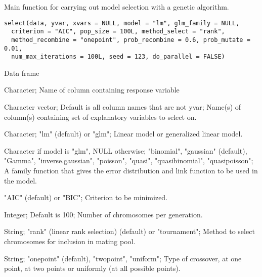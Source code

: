 %
\begin{Description}\relax
Main function for carrying out model selection with a genetic algorithm.
\end{Description}
%
\begin{Usage}
\begin{verbatim}
select(data, yvar, xvars = NULL, model = "lm", glm_family = NULL,
  criterion = "AIC", pop_size = 100L, method_select = "rank",
  method_recombine = "onepoint", prob_recombine = 0.6, prob_mutate = 0.01,
  num_max_iterations = 100L, seed = 123, do_parallel = FALSE)
\end{verbatim}
\end{Usage}
%
\begin{Arguments}
\begin{ldescription}
\item[\code{data}] Data frame

\item[\code{yvar}] Character; Name of column containing response variable

\item[\code{xvars}] Character vector; Default is all column names that are not yvar;
Name(s) of column(s) containing set of explanatory variables to select on.

\item[\code{model}] Character; "lm" (default) or "glm"; Linear model or
generalized linear model.

\item[\code{glm\_family}] Character if model is "glm", NULL otherwise;
"binomial", "gaussian" (default), "Gamma", "inverse.gaussian", "poisson", "quasi",
"quasibinomial", "quasipoisson"; A family function that gives the error
distribution and link function to be used in the model.

\item[\code{criterion}] "AIC" (default) or "BIC"; Criterion to be minimized.

\item[\code{pop\_size}] Integer; Default is 100; Number of chromosomes per generation.

\item[\code{method\_select}] String; "rank" (linear rank selection) (default) or
"tournament"; Method to select chromosomes for inclusion in mating pool.

\item[\code{method\_recombine}] String; "onepoint" (default), "twopoint", "uniform";
Type of crossover, at one point, at two points or uniformly (at all possible points).


\end{ldescription}
\end{Arguments}
